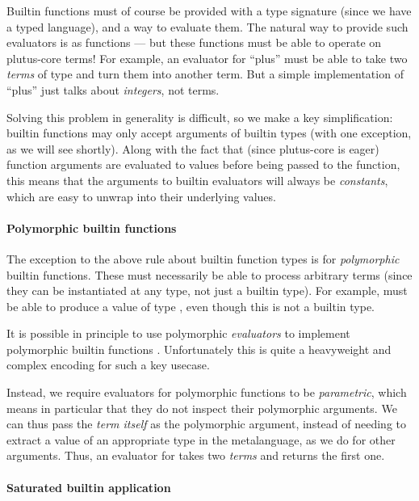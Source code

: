 Builtin functions must of course be provided with a type signature (since we have a typed language), and a way to evaluate them.
The natural way to provide such evaluators is as functions --- but these functions must be able to operate on \gls{plutus-core} terms!
For example, an evaluator for ``plus'' must be able to take two \emph{terms} of type  and turn them into another term.
But a simple implementation of ``plus'' just talks about \emph{integers}, not terms.

Solving this problem in generality is difficult, so we make a key simplification: builtin functions may only accept arguments of builtin types (with one exception, as we will see shortly).
Along with the fact that (since \gls{plutus-core} is eager) function arguments are evaluated to values before being passed to the function, this means that the arguments to builtin evaluators will always be \emph{constants}, which are easy to unwrap into their underlying values.

\paragraph{Polymorphic builtin functions}
\label{sec:polymorphic-builtins}

The exception to the above rule about builtin function types is for \emph{polymorphic} builtin functions.
These must necessarily be able to process arbitrary terms (since they can be instantiated at any type, not just a builtin type).
For example,  must be able to produce a value of type , even though this is not a builtin type.

It is possible in principle to use polymorphic \emph{evaluators} to implement polymorphic builtin functions \autocite{lindley2012embedding}.
Unfortunately this is quite a heavyweight and complex encoding for such a key usecase.

Instead, we require evaluators for polymorphic functions to be \emph{parametric}, which means in particular that they do not inspect their polymorphic arguments.
We can thus pass the \emph{term itself} as the polymorphic argument, instead of needing to extract a value of an appropriate type in the metalanguage, as we do for other arguments.
Thus, an evaluator for  takes two \emph{terms} and returns the first one.

\paragraph{Saturated builtin application}

